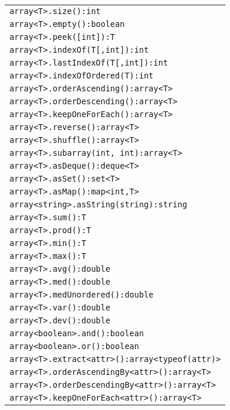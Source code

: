 \begin{table}[htbp]
\centering
\begin{tabular}{|l|}
\hline
\texttt{array<T>.size():int}\\
\texttt{array<T>.empty():boolean}\\
\texttt{array<T>.peek([int]):T}\\
\texttt{array<T>.indexOf(T[,int]):int}\\
\texttt{array<T>.lastIndexOf(T[,int]):int}\\
\texttt{array<T>.indexOfOrdered(T):int}\\
\texttt{array<T>.orderAscending():array<T>}\\
\texttt{array<T>.orderDescending():array<T>}\\
\texttt{array<T>.keepOneForEach():array<T>}\\
\texttt{array<T>.reverse():array<T>}\\
\texttt{array<T>.shuffle():array<T>}\\
\texttt{array<T>.subarray(int, int):array<T>}\\
\texttt{array<T>.asDeque():deque<T>}\\
\texttt{array<T>.asSet():set<T>}\\
\texttt{array<T>.asMap():map<int,T>}\\
\texttt{array<string>.asString(string):string}\\
\hline
\texttt{array<T>.sum():T}\\
\texttt{array<T>.prod():T}\\
\texttt{array<T>.min():T}\\
\texttt{array<T>.max():T}\\
\texttt{array<T>.avg():double}\\
\texttt{array<T>.med():double}\\
\texttt{array<T>.medUnordered():double}\\
\texttt{array<T>.var():double}\\
\texttt{array<T>.dev():double}\\
\texttt{array<boolean>.and():boolean}\\
\texttt{array<boolean>.or():boolean}\\
\hline
\texttt{array<T>.extract<attr>():array<typeof(attr)>}\\
\texttt{array<T>.orderAscendingBy<attr>():array<T>}\\
\texttt{array<T>.orderDescendingBy<attr>():array<T>}\\
\texttt{array<T>.keepOneForEach<attr>():array<T>}\\

\end{tabular}
\end{table}
